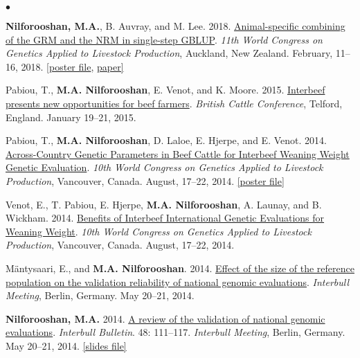\documentclass[margin,line]{res}
\newenvironment{list2}{
  \begin{list}{$\bullet$}{%
      \setlength{\itemsep}{0in}
      \setlength{\parsep}{0in} \setlength{\parskip}{0in}
      \setlength{\topsep}{0in} \setlength{\partopsep}{0in}
      \setlength{\leftmargin}{0.2in}}}{\end{list}}
\begin{document}
\begin{resume}
\begin{list2}
\item {\bf Nilforooshan, M.A.}, B. Auvray, and M. Lee. 2018. \href{http://www.wcgalp.org/proceedings/2018/animal-specific-combining-grm-and-nrm-single-step-gblup}{Animal-specific combining of the GRM and the NRM in single-step GBLUP}. {\em 11th World Congress on Genetics Applied to Livestock Production}, Auckland, New Zealand. February, 11--16, 2018. \href{https://drive.google.com/file/d/1cCNViHs-Dyrmbx3PWbbtQv090rVyx0cL/view?usp=sharing}{[poster file}, \href{https://drive.google.com/file/d/1L-yElfdNZz6nx3tB_TwudN3h9PpF5Pxs/view?usp=sharing}{paper]}
\item Pabiou, T., {\bf M.A. Nilforooshan}, E. Venot, and  K. Moore. 2015. \href{https://www.cattlebreeders.org.uk/workspace/documents/2015digest.pdf}{Interbeef presents new opportunities for beef farmers}. {\em British Cattle Conference}, Telford, England. January 19--21, 2015.
\item Pabiou, T., {\bf M.A. Nilforooshan}, D. Laloe, E. Hjerpe, and E. Venot. 2014. \href{http://www.wcgalp.org/proceedings/2014/across-country-genetic-parameters-beef-cattle-interbeef-weaning-weight-genetic}{Across-Country Genetic Parameters in Beef Cattle for Interbeef Weaning Weight Genetic Evaluation}. {\em 10th World Congress on Genetics Applied to Livestock Production}, Vancouver, Canada. August, 17--22, 2014. \href{https://drive.google.com/file/d/0B2l_izQwJmVpVzRvOVl1YnNuWjA/view?usp=sharing}{[poster file]}
\item Venot, E., T. Pabiou, E. Hjerpe, {\bf M.A. Nilforooshan}, A. Launay, and B. Wickham. 2014. \href{http://www.wcgalp.org/proceedings/2014/benefits-interbeef-international-genetic-evaluations-weaning-weight}{Benefits of Interbeef International Genetic Evaluations for Weaning Weight}. {\em 10th World Congress on Genetics Applied to Livestock Production}, Vancouver, Canada. August, 17--22, 2014.
\item M\"{a}ntysaari, E., and {\bf M.A. Nilforooshan}. 2014. \href{https://www.interbull.org/web/static/presentations/Berlin/Wednesday/10_14_Mantysaari.pdf}{Effect of the size of the reference population on the validation reliability of national genomic evaluations}. {\em Interbull Meeting}, Berlin, Germany. May 20--21, 2014.
\item {\bf Nilforooshan, M.A.} 2014. \href{https://journal.interbull.org/index.php/ib/article/view/1360}{A review of the validation of national genomic evaluations}. {\em Interbull Bulletin}. 48: 111--117. {\em Interbull Meeting}, Berlin, Germany. May 20--21, 2014. \href{https://www.interbull.org/web/static/presentations/Berlin/Wednesday/10_01_Nilforooshan.pdf}{[slides file]}

\end{list2}
\end{resume}
\end{document}
